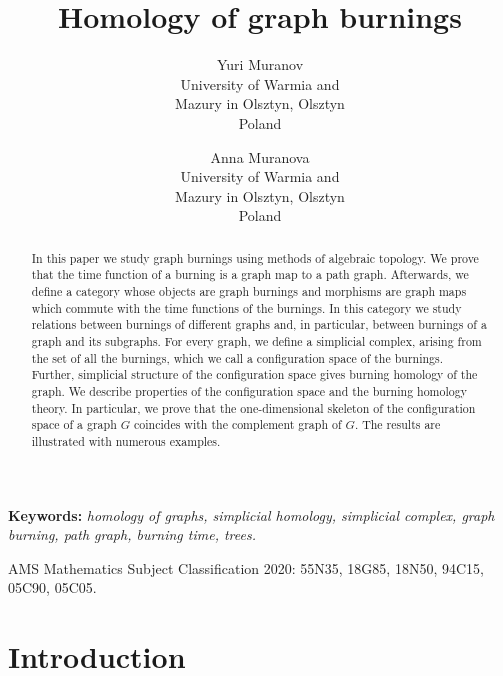 \documentclass[a4paper, 11pt]{article}
\begin{document}
\author{Yuri Muranov \\
University  of  Warmia and \\
Mazury in Olsztyn, Olsztyn\\
Poland \\
\and 
Anna Muranova \\
University  of  Warmia and \\
Mazury in Olsztyn, Olsztyn\\
Poland \\
}
\title{Homology of  graph burnings}
\date{}
\maketitle

\begin{abstract} In this paper   we study graph burnings using  methods of algebraic topology.  We prove that the  time function  of a burning is a graph map to a path graph.  Afterwards,  we define  a category whose  objects are  graph  burnings and  morphisms  are graph maps  which commute with   the time functions of the burnings.  In this category we study relations between burnings of different graphs and, in particular, between 
burnings of  a graph and its  subgraphs.    For every graph, we  define a simplicial complex, arising  from the set of all the burnings, which we call a configuration space of the burnings.  Further,  simplicial structure of the configuration space gives  burning homology  of the graph. We  describe properties of the configuration space  and the burning homology theory. In particular,  we prove that the one-dimensional skeleton of the configuration space of a graph $G$  coincides with the complement graph of $G$. The results are illustrated with numerous examples. 
\end{abstract}


{\bf Keywords:} \emph{homology of graphs, simplicial homology, simplicial complex, graph burning,  path graph,     burning time,  trees.}
\bigskip

AMS Mathematics Subject Classification 2020:  55N35, 18G85, 18N50,    94C15, 05C90, 05C05.


\section{Introduction}\label{S1}
\setcounter{equation}{0}
\end{document}
